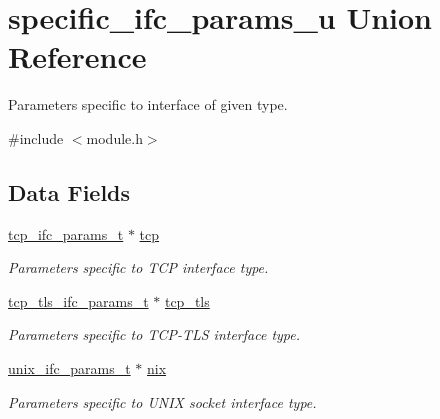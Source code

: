 \hypertarget{unionspecific__ifc__params__u}{}\section{specific\+\_\+ifc\+\_\+params\+\_\+u Union Reference}
\label{unionspecific__ifc__params__u}


Parameters specific to interface of given type.  




{\ttfamily \#include $<$module.\+h$>$}

\subsection*{Data Fields}
\begin{DoxyCompactItemize}
\item 
\mbox{\label{unionspecific__ifc__params__u_a901bc298f5a5437e08c9e719d374c67a}} 
\hyperlink{structtcp__ifc__params__s}{tcp\+\_\+ifc\+\_\+params\+\_\+t} $\ast$ \hyperlink{unionspecific__ifc__params__u_a901bc298f5a5437e08c9e719d374c67a}{tcp}
\begin{DoxyCompactList}\small\item\em Parameters specific to T\+CP interface type. \end{DoxyCompactList}\item 
\mbox{\label{unionspecific__ifc__params__u_a32bf73d559eb0074a718de482a187892}} 
\hyperlink{structtcp__tls__ifc__params__s}{tcp\+\_\+tls\+\_\+ifc\+\_\+params\+\_\+t} $\ast$ \hyperlink{unionspecific__ifc__params__u_a32bf73d559eb0074a718de482a187892}{tcp\+\_\+tls}
\begin{DoxyCompactList}\small\item\em Parameters specific to T\+C\+P-\/\+T\+LS interface type. \end{DoxyCompactList}\item 
\mbox{\label{unionspecific__ifc__params__u_a5e99d445af8b7f749ea683e497dc713c}} 
\hyperlink{structunix__ifc__params__s}{unix\+\_\+ifc\+\_\+params\+\_\+t} $\ast$ \hyperlink{unionspecific__ifc__params__u_a5e99d445af8b7f749ea683e497dc713c}{nix}
\begin{DoxyCompactList}\small\item\em Parameters specific to U\+N\+IX socket interface type. \end{DoxyCompactList}\item 

\end{DoxyCompactItemize}
